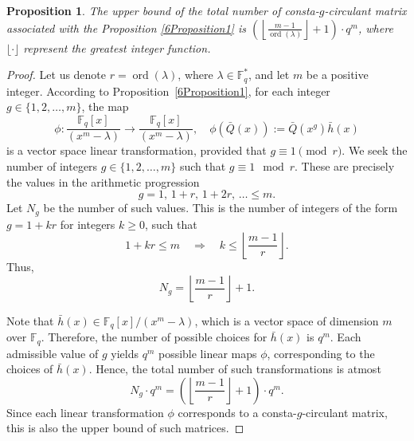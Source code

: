 \documentclass[10pt,a4paper]{amsart}
\newtheorem{proposition}{Proposition}
\begin{document}
\begin{proposition}\label{6counting1}
The upper bound of the total number of consta-$g$-circulant matrix associated with the Proposition \ref{6Proposition1} is $\left( \left\lfloor \frac{m - 1}{\operatorname{ord}(\lambda)} \right\rfloor + 1 \right) \cdot q^m$, where  $\lfloor \cdot \rfloor$ represent the greatest integer function.
\end{proposition}\label{6Proposition002}

\begin{proof}
	Let us denote \( r = \operatorname{ord}(\lambda) \), where \( \lambda \in \mathbb{F}_q^* \), and let \( m \) be a positive integer. According to Proposition~\ref{6Proposition1}, for each integer \( g \in \{1, 2, \dots, m\} \), the map
	\[
	\phi: \frac{\mathbb{F}_q[x]}{(x^m - \lambda)} \to \frac{\mathbb{F}_q[x]}{(x^m - \lambda)}, \quad \phi(\bar{Q}(x)) := \bar{Q}(x^g)\bar{h}(x)
	\]
	is a vector space linear transformation, provided that
	\(
	g \equiv 1 \pmod{r}.
	\) We seek the number of integers \( g \in \{1, 2, \dots, m\} \) such that \( g \equiv 1 \mod r \). These are precisely the values in the arithmetic progression
	\[
	g = 1,\, 1 + r,\, 1 + 2r,\, \dotsc \leq m.
	\]
	Let \( N_g \) be the number of such values. This is the number of integers of the form \( g = 1 + kr \) for integers \( k \geq 0 \), such that
	\[
	1 + kr \leq m \quad \Rightarrow \quad k \leq \left\lfloor \frac{m - 1}{r} \right\rfloor.
	\]
	Thus,
	\[
	N_g = \left\lfloor \frac{m - 1}{r} \right\rfloor + 1.
	\]
	
\noindent 	Note that \( \bar{h}(x) \in \mathbb{F}_q[x]/(x^m - \lambda) \), which is a vector space of dimension \( m \) over \( \mathbb{F}_q \). Therefore, the number of possible choices for \( \bar{h}(x) \) is $q^m.$ Each admissible value of \( g \) yields \( q^m \) possible linear maps \( \phi \), corresponding to the choices of \( \bar{h}(x) \). Hence, the total number of such transformations is atmost
	$$ N_g \cdot q^m = \left( \left\lfloor \frac{m - 1}{r} \right\rfloor + 1 \right) \cdot q^m.
	$$
	Since each linear transformation \( \phi \) corresponds to a consta-$g$-circulant matrix, this is also the upper bound of  such matrices.
	
\end{proof}
\end{document}
